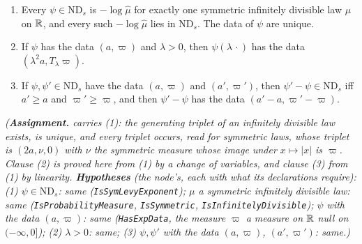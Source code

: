 \begin{lemma}
\label{lem:line-exponent-data}
\leanok
{}
\begin{enumerate}
\item Every $\psi \in \mathrm{ND}_s$ is $-\log\widehat\mu$ for exactly one symmetric infinitely
divisible law $\mu$ on $\mathbb{R}$, and every such $-\log\widehat\mu$ lies in $\mathrm{ND}_s$. The data of
$\psi$ are unique.
\item If $\psi$ has the data $(a, \varpi)$ and $\lambda > 0$, then $\psi(\lambda\,\cdot)$ has the
data $(\lambda^2a, T_\lambda\varpi)$.
\item If $\psi, \psi' \in \mathrm{ND}_s$ have the data $(a, \varpi)$ and $(a', \varpi')$, then
$\psi' - \psi \in \mathrm{ND}_s$ iff $a' \ge a$ and $\varpi' \ge \varpi$, and then $\psi' - \psi$
has the data $(a' - a, \varpi' - \varpi)$.
\end{enumerate}
\statusA\quad{}\quad\emph{(\textbf{Assignment.}  carries (1): the
generating triplet of an infinitely divisible law exists, is unique, and every triplet occurs, read
for symmetric laws, whose triplet is $(2a, \nu, 0)$ with $\nu$ the symmetric measure whose image
under $x \mapsto |x|$ is $\varpi$. Clause (2) is proved here from (1) by a change of variables,
and clause (3) from (1) by linearity. \textbf{Hypotheses} (the node's, each with what its
declarations require): (1) $\psi \in \mathrm{ND}_s$: same (\texttt{IsSymLevyExponent}); $\mu$ a
symmetric infinitely divisible law: same (\texttt{IsProbabilityMeasure}, \texttt{IsSymmetric},
\texttt{IsInfinitelyDivisible}); $\psi$ with the data $(a, \varpi)$: same (\texttt{HasExpData}, the
measure $\varpi$ a measure on $\mathbb{R}$ null on $(-\infty, 0]$); (2) $\lambda > 0$: same; (3) $\psi,
\psi'$ with the data $(a, \varpi)$, $(a', \varpi')$: same.)}
\end{lemma}

